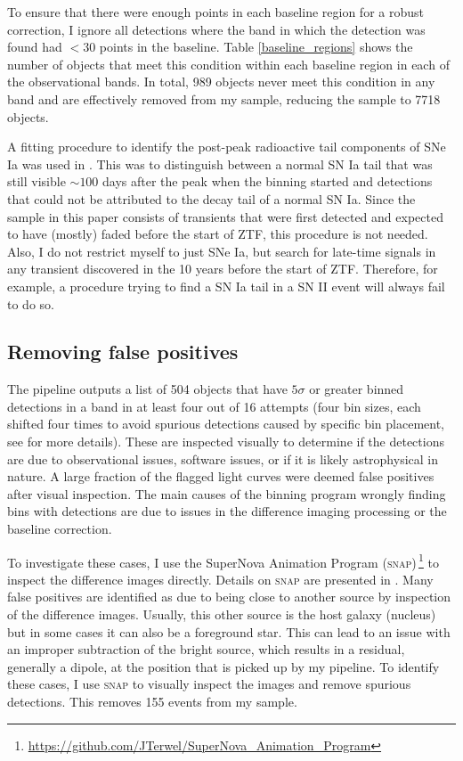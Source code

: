\documentclass[a4paper,oneside,12pt, class=Latex/Classes/PhDthesisPSnPDF, crop=false]{standalone}
\begin{document}
To ensure that there were enough points in each baseline region for a robust correction, I ignore all detections where the band in which the detection was found had $< 30$ points in the baseline. Table \ref{baseline_regions} shows the number of objects that meet this condition within each baseline region in each of the observational bands. In total, 989 objects never meet this condition in any band and are effectively removed from my sample, reducing the sample to 7718 objects.

A fitting procedure to identify the post-peak radioactive tail components of SNe Ia was used in \citet{Terwel_2024_paper1}. This was to distinguish between a normal SN Ia tail that was still visible $\sim100$ days after the peak when the binning started and detections that could not be attributed to the decay tail of a normal SN Ia. Since the sample in this paper consists of transients that were first detected and expected to have (mostly) faded before the start of ZTF, this procedure is not needed. Also, I do not restrict myself to just SNe Ia, but search for late-time signals in any transient discovered in the 10 years before the start of ZTF. Therefore, for example, a procedure trying to find a SN Ia tail in a SN II event will always fail to do so.


\subsection{Removing false positives}
\label{sec:false_positives}
The pipeline outputs a list of 504 objects that have $5\sigma$ or greater binned detections in a band in at least four out of 16 attempts (four bin sizes, each shifted four times to avoid spurious detections caused by specific bin placement, see \citealt{Terwel_2024_paper1} for more details). These are inspected visually to determine if the detections are due to observational issues, software issues, or if it is likely astrophysical in nature. A large fraction of the flagged light curves were deemed false positives after visual inspection. The main causes of the binning program wrongly finding bins with detections are due to issues in the difference imaging processing or the baseline correction.

To investigate these cases, I use the SuperNova Animation Program (\textsc{snap})\,\footnote{\url{https://github.com/JTerwel/SuperNova_Animation_Program}} to inspect the difference images directly. Details on \textsc{snap} are presented in \citet{Terwel_2024_paper1}. Many false positives are identified as due to being close to another source by inspection of the difference images. Usually, this other source is the host galaxy (nucleus) but in some cases it can also be a foreground star. This can lead to an issue with an improper subtraction of the bright source, which results in a residual, generally a dipole, at the position that is picked up by my pipeline. To identify these cases, I use \textsc{snap} to visually inspect the images and remove spurious detections. This removes 155  events from my sample.
\end{document}
